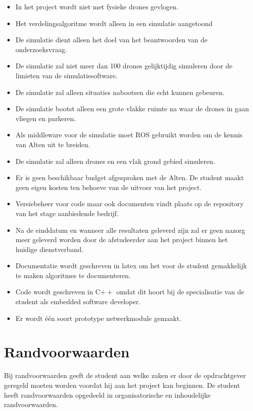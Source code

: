 \documentclass[a4paper, 11pt, oneside]{report}
\begin{document}
\begin{itemize}
	\item In het project wordt niet met fysieke drones gevlogen.
	\item Het verdelingsalgoritme wordt alleen in een simulatie aangetoond
	\item De simulatie dient alleen het doel van het beantwoorden van de onderzoeksvraag.
	\item De simulatie zal niet meer dan 100 drones gelijktijdig simuleren door de limieten van de simulatiesoftware.
	\item De simulatie zal alleen situaties nabootsen die echt kunnen gebeuren.
	\item De simulatie bootst alleen een grote vlakke ruimte na waar de drones in gaan vliegen en parkeren.
	\item Als middleware voor de simulatie moet ROS gebruikt worden om de kennis van Alten uit te breiden.
	\item De simulatie zal alleen drones en een vlak grond gebied simuleren.
	\item Er is geen beschikbaar budget afgesproken met de Alten. De student maakt geen eigen kosten ten behoeve van de uitvoer van het	project. 
	\item Versiebeheer voor code maar ook documenten vindt plaats op de repository van het stage aanbiedende bedrijf.
	\item Na de einddatum en wanneer alle resultaten geleverd zijn zal er geen nazorg meer geleverd
	worden door de afstudeerder aan het project binnen het huidige dienstverband.
	\item Documentatie wordt geschreven in latex om het voor de student gemakkelijk te maken algoritmes te documenteren.
	\item Code wordt geschreven in C$++$ omdat dit hoort bij de specialisatie van de student als embedded software developer.
	\item Er wordt één soort prototype netwerkmodule gemaakt.
\end{itemize}

\chapter{Randvoorwaarden}
\label{chapter:randvoorwaarden}
Bij randvoorwaarden geeft de student aan welke zaken er door de opdrachtgever geregeld moeten worden voordat hij aan het project kan beginnen. De student heeft randvoorwaarden opgedeeld in organisatorische en inhoudelijke randvoorwaarden. 
\end{document}
